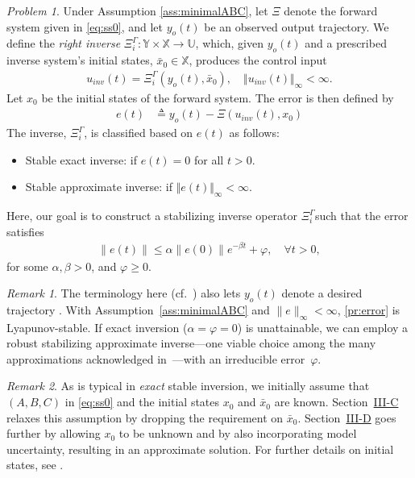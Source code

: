 \documentclass[10pt,a4paper]{amsart}
\theoremstyle{remark}
\newtheorem{remark}{Remark}
\newtheorem{problem}{Problem}
\begin{document}
\begin{problem} \label{pr:problem definition}
{Under Assumption \ref{ass:minimalABC}, let \(\Xi\) denote the forward system given in \eqref{eq:ss0}, and let \(y_o(t)\) be an observed output trajectory. We define the \textit{right inverse} $\Xi_i^\Gamma: \mathbb{Y}\times\mathbb{X}\to\mathbb{U}$, which, given $y_o(t)$ and a prescribed inverse system's initial states, $\bar{x}_0 \in \mathbb{X}$, produces the control input
\begin{align} \label{eq:uinvpr}
u_{inv}(t) = \Xi_{i}^\Gamma(y_o(t),\bar{x}_0), \quad \Vert u_{inv}(t) \Vert_\infty < \infty.
\end{align}
Let $x_0$ be the initial states of the forward system. The error is then defined by
\begin{align} \label{pr:error}
    e(t) &\triangleq  y_o(t)-\Xi(u_{inv}(t),x_0) 
\end{align}
The inverse, $\Xi_i^\Gamma$,} is classified based on $e(t)$ as follows:
\begin{itemize}
   \item[a.]  {Stable exact inverse}: if \( e(t) = 0 \) for all \( t > 0 \).
   \item[b.]  {Stable approximate inverse}: if \( \Vert e(t) \Vert_\infty < \infty \).
\end{itemize}
Here, our goal is to construct a stabilizing inverse operator \( \Xi_i^\Gamma \)such that the error satisfies
\begin{align}\label{ESwithinevitabeerrors}
   \| e(t)\| \leq \alpha \|e(0)\| e^{-\beta t} + \varphi, \quad \forall t > 0,
\end{align}
for some $\alpha, \beta > 0$, and $\varphi \geq 0$.
\end{problem}
\begin{remark} \label{rem:similarproblems}
The terminology here (cf.\ \cite{estrada2007left}) also lets $y_o(t)$ denote a desired trajectory \cite{naderi2018inversion}.  With Assumption~\ref{ass:minimalABC} and $\|e\|_\infty<\infty$, \eqref{pr:error} is Lyapunov-stable. If exact inversion ($\alpha=\varphi=0$) is unattainable, we can employ a robust stabilizing approximate inverse—one viable choice among the many approximations acknowledged in~\cite{romagnoli2019general}—with an irreducible error~$\varphi$.
\end{remark}
\begin{remark}\label{rem:ic}  
As is typical in \textit{exact} stable inversion, we initially assume that \((A, B, C)\) in \eqref{eq:ss0} and the initial states \(x_0\) and  \(\bar{x}_0\) are known. Section~\href{https://arxiv.org/abs/2501.00172v4}{III-C} relaxes this assumption by dropping the requirement on \(\bar x_0\).
Section~\href{https://arxiv.org/abs/2501.00172v4}{III-D} goes further by allowing \(x_0\) to be unknown and by also incorporating model uncertainty, resulting in an approximate solution. For further details on initial states, see \cite{Loreto2023}.
\end{remark}
\end{document}
